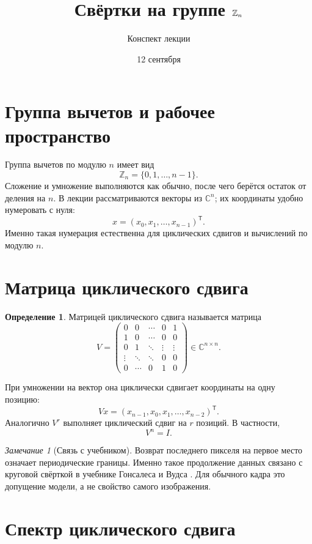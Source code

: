 \documentclass[12pt,a4paper]{article}
\title{Свёртки на группе $\ZZ_n$}
\author{Конспект лекции}
\date{12 сентября}
\theoremstyle{definition}
\newtheorem{definition}{Определение}
\theoremstyle{remark}
\newtheorem*{remark}{Замечание}
\newcommand{\CC}{\mathbb{C}}
\newcommand{\ZZ}{\mathbb{Z}}
\begin{document}
\maketitle

\section{Группа вычетов и рабочее пространство}

Группа вычетов по модулю $n$ имеет вид
\[
  \ZZ_n=\{0,1,\dots,n-1\}.
\]
Сложение и умножение выполняются как обычно, после чего берётся остаток от
деления на $n$. В лекции рассматриваются векторы из $\CC^n$; их координаты
удобно нумеровать с нуля:
\[
  x=(x_0,x_1,\dots,x_{n-1})^{\mathsf T}.
\]
Именно такая нумерация естественна для циклических сдвигов и вычислений по
модулю $n$.

\section{Матрица циклического сдвига}

\begin{definition}
Матрицей циклического сдвига называется матрица
\[
  V=
  \begin{pmatrix}
    0      & 0      & \cdots & 0      & 1\\
    1      & 0      & \cdots & 0      & 0\\
    0      & 1      & \ddots & \vdots & \vdots\\
    \vdots & \ddots & \ddots & 0      & 0\\
    0      & \cdots & 0      & 1      & 0
  \end{pmatrix}\in\CC^{n\times n}.
\]
\end{definition}

При умножении на вектор она циклически сдвигает координаты на одну позицию:
\[
  Vx=(x_{n-1},x_0,x_1,\dots,x_{n-2})^{\mathsf T}.
\]
Аналогично $V^r$ выполняет циклический сдвиг на $r$ позиций. В частности,
\[
  V^n=I.
\]

\begin{remark}[Связь с учебником]
Возврат последнего пикселя на первое место означает периодические
границы. Именно такое продолжение данных связано с круговой свёрткой
в учебнике Гонсалеса и Вудса \cite[\S\,4.4.1, с.~270]{GW2012}.
Для обычного кадра это допущение модели, а не свойство самого изображения.
\end{remark}

\section{Спектр циклического сдвига}
\end{document}

